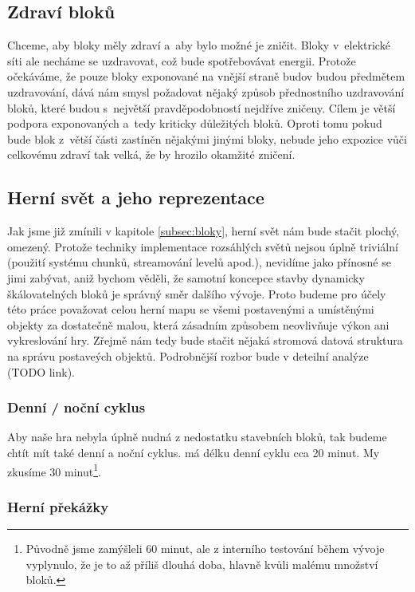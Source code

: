 \subsection{Zdraví bloků}
Chceme, aby bloky měly zdraví a~aby bylo možné je zničit. Bloky v~elektrické síti ale necháme se uzdravovat, což bude spotřebovávat energii. Protože očekáváme, že pouze bloky exponované na vnější straně budov budou předmětem uzdravování, dává nám smysl požadovat nějaký způsob přednostního uzdravování bloků, které budou s~největší pravděpodobností nejdříve zničeny. Cílem je větší podpora exponovaných a~tedy kriticky důležitých bloků. Oproti tomu pokud bude blok z~větší části zastíněn nějakými jinými bloky, nebude jeho expozice vůči celkovému zdraví tak velká, že by hrozilo okamžité zničení.

\subsection{Herní svět a jeho reprezentace}

Jak jsme již zmínili v kapitole \ref{subsec:bloky}, herní svět nám bude stačit plochý, omezený. Protože techniky implementace rozsáhlých světů nejsou úplně triviální (použití systému chunků, streamování levelů apod.), nevidíme jako přínosné se jimi zabývat, aniž bychom věděli, že samotní koncepce stavby dynamicky škálovatelných bloků je správný směr dalšího vývoje. Proto budeme pro účely této práce považovat celou herní mapu se všemi postavenými a umístěnými objekty za dostatečně malou, která zásadním způsobem neovlivňuje výkon ani vykreslování hry.
Zřejmě  nám tedy bude stačit nějaká stromová datová struktura na správu postaveých objektů. Podrobnější rozbor bude v deteilní analýze (TODO link).

\subsubsection{Denní / noční cyklus}
Aby naše hra nebyla úplně nudná z nedostatku stavebních bloků, tak budeme chtít mít také denní a noční cyklus. \MC{} má délku denní cyklu cca 20 minut. My zkusíme 30 minut\footnote{Původně jsme zamýšleli 60 minut, ale z interního testování během vývoje vyplynulo, že je to až příliš dlouhá doba, hlavně kvůli malému množství bloků.}.

\subsubsection{Herní překážky}

